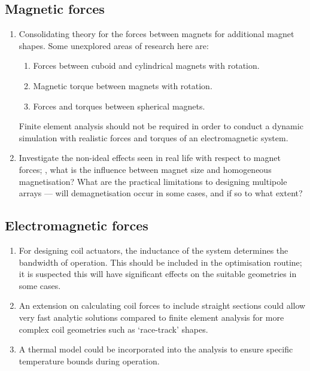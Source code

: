 \documentclass[10pt,a4paper]{memoir}
\begin{document}
\subsection{Magnetic forces}

\begin{enumerate}\itemsep=\medskipamount
\item
Consolidating theory for the forces between magnets for additional magnet shapes.
Some unexplored areas of research here are:
\begin{enumerate}
\item Forces between cuboid and cylindrical magnets with rotation.
\item Magnetic torque between magnets with rotation.
\item Forces and torques between spherical magnets.
\end{enumerate}
Finite element analysis should not be required in order to conduct a dynamic simulation with realistic forces and torques of an electromagnetic system.

\item
Investigate the non-ideal effects seen in real life with respect to magnet forces; \eg, what is the influence between magnet size and homogeneous magnetisation?
What are the practical limitations to designing multipole arrays — will demagnetisation occur in some cases, and if so to what extent?

\end{enumerate}

\subsection{Electromagnetic forces}

\begin{enumerate}
\item For designing coil actuators, the inductance of the system determines the bandwidth of operation.
This should be included in the optimisation routine; it is suspected this will have significant effects on the suitable geometries in some cases.

\item An extension on calculating coil forces to include straight sections could allow very fast analytic solutions compared to finite element analysis for more complex coil geometries such as `race-track' shapes.

\item A thermal model could be incorporated into the analysis to ensure specific temperature bounds during operation.
\end{enumerate}
\end{document}
